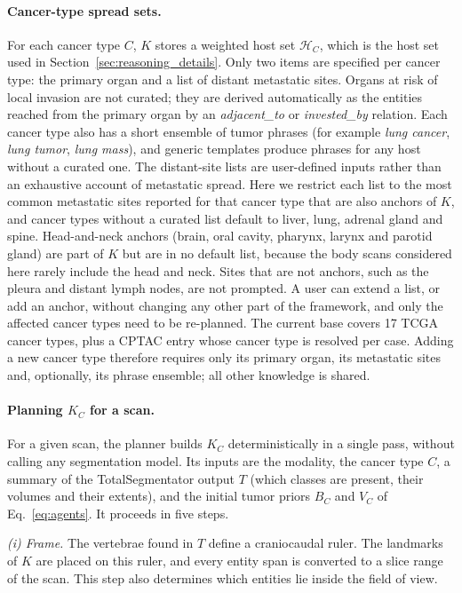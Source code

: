 \documentclass[fleqn,10pt]{olplainarticle}
\begin{document}
\paragraph{Cancer-type spread sets.}
For each cancer type $C$, $K$ stores a weighted host set $\mathcal{H}_C$, which is the host set used in
Section~\ref{sec:reasoning_details}. Only two items are specified per cancer type: the primary organ and a list of
distant metastatic sites. Organs at risk of local invasion are not curated; they are
derived automatically as the entities reached from the primary organ by an \emph{adjacent\_to} or \emph{invested\_by}
relation. Each cancer type also has a short ensemble of tumor phrases (for example \emph{lung cancer}, \emph{lung
tumor}, \emph{lung mass}), and generic templates produce phrases for any host without a curated one. The distant-site lists are user-defined inputs rather than an exhaustive account of metastatic spread. Here we
restrict each list to the most common metastatic sites reported for that cancer type that are also anchors of $K$, and
cancer types without a curated list default to liver, lung, adrenal gland and spine. Head-and-neck anchors (brain, oral cavity,
pharynx, larynx and parotid gland) are part of $K$ but are in no default list, because the body scans considered here
rarely include the head and neck. Sites that are not anchors, such
as the pleura and distant lymph nodes, are not prompted. A user can extend a list, or add an anchor, without changing any other part of the framework, and only the affected cancer types need to be re-planned. The current
base covers 17 TCGA cancer types, plus a CPTAC entry whose cancer type is resolved per case. Adding a new cancer type
therefore requires only its primary organ, its metastatic sites and, optionally, its phrase ensemble; all other
knowledge is shared.

\paragraph{Planning $K_C$ for a scan.}
For a given scan, the planner builds $K_C$ deterministically in a single pass, without calling any segmentation model.
Its inputs are the modality, the cancer type $C$, a summary of the TotalSegmentator output $T$ (which classes are
present, their volumes and their extents), and the initial tumor priors $B_C$ and $V_C$ of Eq.~\eqref{eq:agents}.
It proceeds in five steps.

\emph{(i) Frame.} The vertebrae found in $T$ define a craniocaudal ruler. The landmarks of $K$ are placed on this ruler,
and every entity span is converted to a slice range of the scan. This step also determines which entities lie inside the
field of view.
\end{document}
